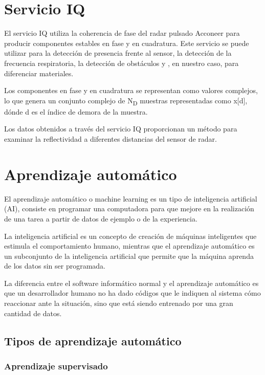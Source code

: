 \section{Servicio IQ}

El servicio IQ utiliza la coherencia de fase del radar pulsado Acconeer para producir componentes estables en fase y en cuadratura. Este servicio se puede utilizar para la detección de presencia frente al sensor, la detección de la frecuencia respiratoria, la detección de obstáculos y , en nuestro caso, para diferenciar materiales.

Los componentes en fase y en cuadratura se representan como valores complejos, lo que genera un conjunto complejo de N\textsubscript{D} muestras representadas como x[d], dónde d es el índice de demora de la muestra.

Los datos obtenidos a través del servicio IQ proporcionan un método para examinar la reflectividad a diferentes distancias del sensor de radar.

\section{Aprendizaje automático}

El aprendizaje automático o machine learning es un tipo de inteligencia artificial (AI),
consiste en programar una computadora para que mejore en la realización de una tarea a partir de datos de ejemplo o de la experiencia.

La inteligencia artificial es un concepto de creación de máquinas inteligentes que estimula el comportamiento humano, mientras que el aprendizaje automático es un subconjunto de la inteligencia artificial que permite que la máquina aprenda de los datos sin ser programada.

La diferencia entre el software informático normal y el aprendizaje automático es que un desarrollador humano no ha dado códigos que le indiquen al sistema cómo reaccionar ante la situación, sino que está siendo entrenado por una gran cantidad de datos.

\subsection{Tipos de aprendizaje automático}

\subsubsection{Aprendizaje supervisado}

